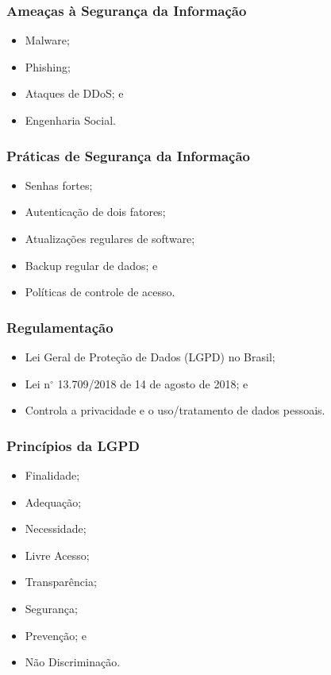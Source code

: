\documentclass[aspectratio=169]{beamer} %
\begin{document}
\begin{frame}
	\frametitle{Ameaças à Segurança da Informação}
	
	\begin{itemize}
		\item Malware;
		\item Phishing;
		\item Ataques de DDoS; e
		\item Engenharia Social.
	\end{itemize}
\end{frame}

\begin{frame}
	\frametitle{Práticas de Segurança da Informação}
	
	\begin{itemize}
		\item Senhas fortes;
		\item Autenticação de dois fatores;
		\item Atualizações regulares de software;
		\item Backup regular de dados; e
		\item Políticas de controle de acesso.
	\end{itemize}
\end{frame}

\begin{frame}
	\frametitle{Regulamentação}
	
	\begin{itemize}
		\item Lei Geral de Proteção de Dados (LGPD) no Brasil;
		\item Lei n$^{\circ}$ 13.709/2018 de 14 de agosto de 2018; e
		\item Controla a privacidade e o uso/tratamento de dados pessoais.
	\end{itemize}
\end{frame}

\begin{frame}
	\frametitle{Princípios da LGPD}
	
	\begin{itemize}
		\item Finalidade;
		\item Adequação;
		\item Necessidade;
		\item Livre Acesso;
		\item Transparência;
		\item Segurança;
		\item Prevenção; e
		\item Não Discriminação.
	\end{itemize}
\end{frame}
\end{document}

